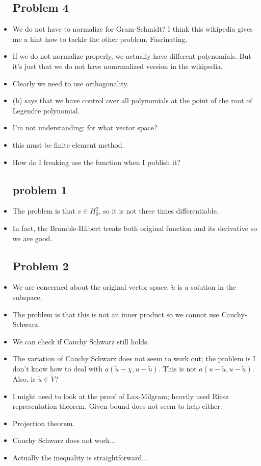 \documentclass{article}
\theoremstyle{remark}
\begin{document}
\begin{itemize}
\subsection*{Problem 4}
\item We do not have to normalize for Gram-Schmidt? I think this wikipedia gives me a hint how to tackle the other problem. Fascinating.
\item If we do not normalize properly, we actually have different polynomials. But it's just that we do not have nomrmalized version in the wikipedia.
\item Clearly we need to use orthogonality.
\item (b) says that we have control over all polynomials at the point of the root of Legendre polynomial.
\item I'm not understanding: for what vector space?
\item this must be finite element method. 
\item How do I freaking use the function when I publish it?
\subsection*{problem 1}
\item The problem is that $v\in H^2_0$, so it is not three times differentiable.
\item In fact, the Bramble-Hilbert treats both original function and its derivative so we are good.
\subsection*{Problem 2}
\item We are concerned about the original vector space. $\tilde u$ is a solution in the subspace. 
\item The problem is that this is not an inner product so we cannot use Cauchy-Schwarz.
\item We can check if Cauchy Schwarz still holds.
\item The variation of Cauchy Schwarz does not seem to work out; the problem is I don't know how to deal with $a(\tilde{u}-\chi,u-\tilde{u})$. This is not $a(u-\tilde{u},u-\tilde{u})$. Also, is $\tilde{u}\in \tilde{V}$?
\item I might need to look at the proof of Lax-Milgram; heavily used Riesz representation theorem. Given bound does not seem to help either.
\item Projection theorem.
\item Cauchy Schwarz does not work...
\item Actually the inequality is straightforward...


\end{itemize}
\end{document}
